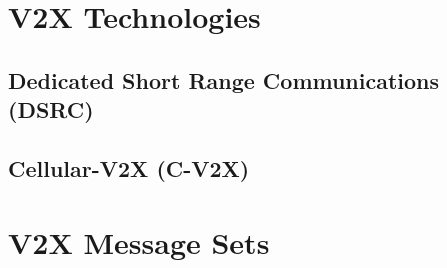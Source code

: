 
% 






\section{V2X Technologies}

\subsection{Dedicated Short Range Communications (DSRC)}

\subsection{Cellular-V2X (C-V2X)}



\section{V2X Message Sets}



